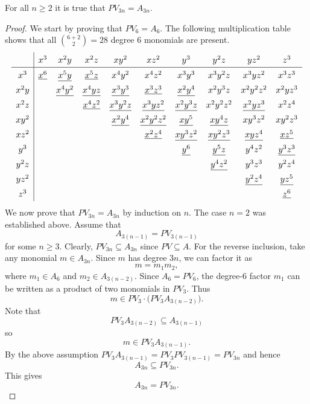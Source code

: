 \begin{lem}\label{asix}
For all $n\geq 2$ it is true that $PV_{3n}=A_{3n}$.
\end{lem}
\enlargethispage{2\baselineskip}
\begin{proof}
We start by proving that $PV_{6}=A_{6}$. The following multiplication table shows that all $\binom{6+2}{2}=28$ degree $6$ monomials are present.
    \[
\resizebox{\textwidth}{!}{$
\renewcommand{\arraystretch}{1.4}
\begin{array}{c|ccccccccc}
 & x^3 & x^2y & x^2z & xy^2 & xz^2 & y^3 & y^2z & yz^2 & z^3 \\ \hline
x^3  & \uline{x^6} & \uline{x^5y} & \uline{x^5z} & x^4y^2 & x^4z^2 & x^3y^3 & x^3y^2z & x^3yz^2 & x^3z^3 \\
x^2y &     & \uline{x^4y^2} & \uline{x^4yz} & \uline{x^3y^3} & \uline{x^3z^3} & \uline{x^2y^4 }& x^2y^3z & x^2y^2z^2 & x^2yz^3 \\
x^2z &     &        & \uline{x^4z^2} & \uline{x^3y^2z} & \uline{x^3yz^2} & \uline{x^2y^3z} & x^2y^2z^2 & \uline{x^2yz^3} & x^2z^4 \\
xy^2 &     &        &        & \uline{x^2y^4} & \uline{x^2y^2z^2} & \uline{xy^5} & \uline{xy^4z} & xy^3z^2 & xy^2z^3 \\
xz^2 &     &        &        &        & \uline{x^2z^4} & \uline{xy^3z^2} & \uline{xy^2z^3} & \uline{xyz^4} & \uline{xz^5} \\
y^3  &     &        &        &        &        & \uline{y^6} & \uline{y^5z} & y^4z^2 & \uline{y^3z^3} \\
y^2z &     &        &        &        &        &      & \uline{y^4z^2} & y^3z^3 & y^2z^4 \\
yz^2 &     &        &        &        &        &      &         & \uline{y^2z^4} & \uline{yz^5} \\
z^3  &     &        &        &        &        &      &         &         & \uline{z^6}
\end{array}
$}
\]
\noindent
 We now prove that $PV_{3n}=A_{3n}$ by induction on $n$. The case $n=2$ was established above. Assume that
\[
A_{3(n-1)}=PV_{3(n-1)}
\]
for some $n\geq 3$. Clearly, $PV_{3n}\subseteq A_{3n}$ since $PV\subseteq A$. For the reverse inclusion, take any monomial $m\in A_{3n}$. Since $m$ has degree $3n$, we can factor it as
\[
m=m_1m_2,
\]
where $m_1\in A_6$ and $m_2\in A_{3(n-2)}$. Since $A_6=PV_6$, the degree-$6$ factor $m_1$ can be written as a product of two monomials in $PV_3$. Thus
\[
m\in PV_3\cdot\bigl(PV_3A_{3(n-2)}\bigr).
\]
Note that 
\[ PV_3A_{3(n-2)}\subseteq A_{3(n-1)}\] 
so
\[
m\in PV_3A_{3(n-1)}.
\]
By the above assumption $PV_3A_{3(n-1)}=PV_3PV_{3(n-1)}=PV_{3n}$ and hence
\[
A_{3n}\subseteq PV_{3n}.
\]
This gives
\[
A_{3n}=PV_{3n}.
\]
\end{proof}
